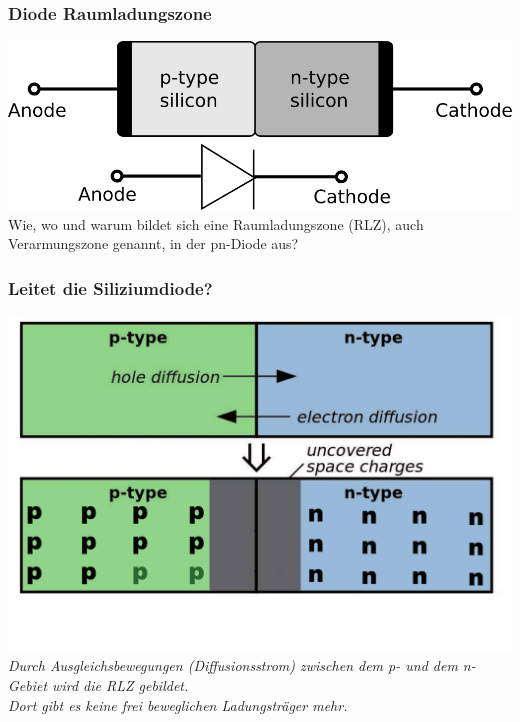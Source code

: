 \begin{frame}
    \frametitle{Diode Raumladungszone}
    \begin{center}
        \includegraphics[width=1\textwidth,height=.7\textheight,keepaspectratio]{a05/diode_with_electrical_symbol.png}
        \tiny \hyperlink{refs}{\cite{wm}} \\[3em]
     \large Wie, wo und warum bildet sich eine Raumladungszone (RLZ), auch Verarmungszone genannt, in der pn-Diode aus?
     \end{center}
\end{frame}

\begin{frame}
    \frametitle{Leitet die Siliziumdiode?}
    \begin{center}
        \includegraphics[width=1\textwidth,height=.65\textheight,keepaspectratio]{a05/Pn_Junction_Diffusion_and_Drift.pdf}\\
     \emph{Durch Ausgleichsbewegungen (Diffusionsstrom) zwischen dem p- und dem n-Gebiet wird die RLZ gebildet.\\
     		Dort gibt es keine frei beweglichen Ladungsträger mehr.}\
     \end{center}
\end{frame}

